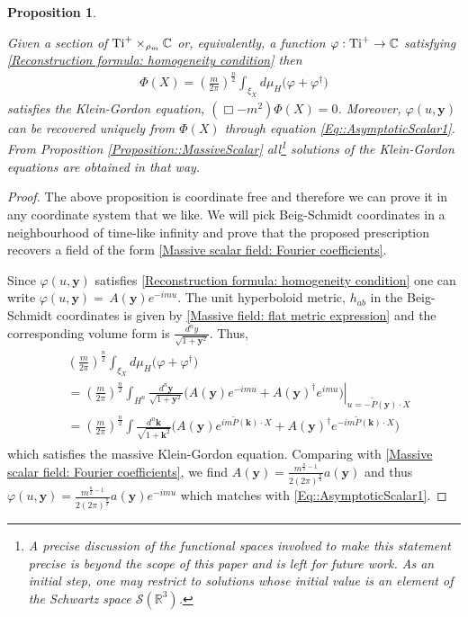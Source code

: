 \documentclass[a4paper, 10pt]{article}
\newtheorem{proposition}{Proposition}[section]
\theoremstyle{remark}
\newcommand{\correc}[1]{#1}
\newcommand{\Ti}{\textnormal{Ti}}
\newcommand{\y}{\bm{y}}
\newcommand{\R}{\mathbb{R}}
\newcommand{\scal}{\cdot} %
\begin{document}
\begin{proposition}\label{Proposition: Reconstruction formula}\mbox{}

    Given a section of $\Ti^+ \times_{\rho_m} \mathbb{C}$ or, equivalently, a function $\varphi: \Ti^+ \rightarrow \mathbb{C}$ satisfying \eqref{Reconstruction formula: homogeneity condition} then
    \begin{align}
        \Phi (X) = \left( \frac{m}{2 \pi} \right)^\frac{n}{2} \int_{\xi_X} d \mu_{H} \big( \varphi + \varphi^{\dagger}\big)
    \end{align}
satisfies the  Klein-Gordon equation, $(\Box - m^2)\Phi (X) =0$. Moreover, $\varphi(u,\y)$ can be recovered uniquely from $\Phi (X)$ through equation \eqref{Eq::AsymptoticScalar1}. From Proposition \ref{Proposition::MassiveScalar} all\footnote{\correc{A precise discussion of the functional spaces involved to make this statement precise is beyond the scope of this paper and is left for future work. As an initial step, one may restrict to solutions whose initial value is an element of the Schwartz space $\mathcal{S}(\R^3)$. }} solutions of the Klein-Gordon equations are obtained in that way.
\end{proposition}




\begin{proof}
The above proposition is coordinate free and therefore we can prove it in any coordinate system that we like. We will pick Beig-Schmidt coordinates in a neighbourhood of time-like infinity and prove that the proposed prescription recovers a field of the form \eqref{Massive scalar field: Fourier coefficients}.

Since $\varphi(u, \y)$ satisfies \eqref{Reconstruction formula: homogeneity condition} one can write $\varphi(u, \y) = \, A(\y) e^{-im u}$.
 The unit hyperboloid metric, $h_{ab}$
 in the Beig-Schmidt coordinates is given by \eqref{Massive field: flat metric expression} and the corresponding volume form is $\frac{d^n y}{\sqrt{1+\y^2}}$. Thus,
    \begin{align}
    \begin{alignedat}{3}
        & \left( \frac{m}{2 \pi} \right)^\frac{n}{2}\int_{\xi_X} d\mu_{H} \big( \varphi + \varphi^{\dagger} \big)\\
        &= \left( \frac{m}{2 \pi} \right)^\frac{n}{2} \int_{H^n} \left. \frac{d^n \y}{\sqrt{1 + \y^2}} \Big( A(\y) e^{- i m u}  + A(\y)^{\dagger} e^{i m u} \Big)\right\vert_{u = - \tilde{P}(\y) \scal X} \\ &= \left( \frac{m}{2 \pi} \right)^\frac{n}{2} \int \frac{d^n \bm{k}}{\sqrt{1 + \bm{k}^2}} \Big( A(\y) e^{i m \tilde{P}(\bm{k}) \scal X} +  A(\y)^{\dagger} e^{-i m \tilde{P}(\bm{k}) \scal X} \Big)
    \end{alignedat}
    \end{align}
which satisfies the massive Klein-Gordon equation. Comparing with \eqref{Massive scalar field: Fourier coefficients}, we find $A(\y) = \frac{m^{\frac{n}{2}-1}}{2 (2\pi)^{\frac{n}{2}}} a(\y)$ and thus $\varphi(u,\y) = \frac{m^{\frac{n}{2}-1}}{2 (2\pi)^{\frac{n}{2}}} a(\y) e^{-im u}$ which matches with \eqref{Eq::AsymptoticScalar1}.
\end{proof}
\end{document}
